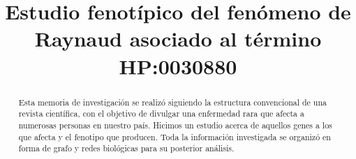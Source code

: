 \documentclass{bmcart}
\begin{document}
	\begin{frontmatter}
	
		\begin{fmbox}
			
			
			\title{Estudio fenotípico del fenómeno de Raynaud asociado al término HP:0030880}			
			
			\author[
			  addressref={aff1},                   %
			  corref={aff1},                       %
			  email={jaldanam21@uma.es}   %
			]{ } %
			\author[
			  addressref={aff1},
			  email={juancaruru@uma.es}
			]{ }
			
			
			\address[id=aff1]{%
			  ,             %
			  ,          %
			  ,                              %
		}
		
		\end{fmbox}%
		
		\begin{abstractbox}
		
			\begin{abstract} %
			
			Esta memoria de investigación se realizó siguiendo la estructura convencional de una revista científica, con el objetivo de divulgar una enfermedad rara que afecta a numerosas personas en nuestro país. Hicimos un estudio acerca de aquellos genes a los que afecta y el fenotipo que producen. Toda la información investigada se organizó en forma de grafo y redes biológicas para su posterior análisis.
						

\end{abstract}
\end{abstractbox}
\end{frontmatter}
\end{document}
